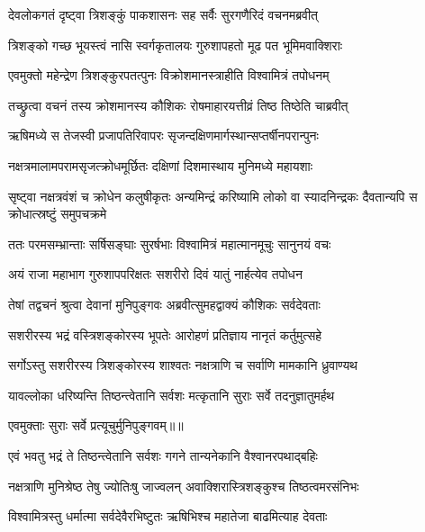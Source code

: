 \twolineshloka
{देवलोकगतं दृष्ट्वा त्रिशङ्कुं पाकशासनः}
{सह सर्वैः सुरगणैरिदं वचनमब्रवीत्} %

\twolineshloka
{त्रिशङ्को गच्छ भूयस्त्वं नासि स्वर्गकृतालयः}
{गुरुशापहतो मूढ पत भूमिमवाक्शिराः} %

\twolineshloka
{एवमुक्तो महेन्द्रेण त्रिशङ्कुरपतत्पुनः}
{विक्रोशमानस्त्राहीति विश्वामित्रं तपोधनम्} %

\twolineshloka
{तच्छ्रुत्वा वचनं तस्य क्रोशमानस्य कौशिकः}
{रोषमाहारयत्तीव्रं तिष्ठ तिष्ठेति चाब्रवीत्} %

\twolineshloka
{ऋषिमध्ये स तेजस्वी प्रजापतिरिवापरः}
{सृजन्दक्षिणमार्गस्थान्सप्तर्षीनपरान्पुनः} %

\twolineshloka
{नक्षत्रमालामपरामसृजत्क्रोधमूर्छितः}
{दक्षिणां दिशमास्थाय मुनिमध्ये महायशाः} %

\threelineshloka
{सृष्ट्वा नक्षत्रवंशं च क्रोधेन कलुषीकृतः}
{अन्यमिन्द्रं करिष्यामि लोको वा स्यादनिन्द्रकः}
{दैवतान्यपि स क्रोधात्स्रष्टुं समुपचक्रमे} %

\twolineshloka
{ततः परमसम्भ्रान्ताः सर्षिसङ्घाः सुरर्षभाः}
{विश्वामित्रं महात्मानमूचुः सानुनयं वचः} %

\twolineshloka
{अयं राजा महाभाग गुरुशापपरिक्षतः}
{सशरीरो दिवं यातुं नार्हत्येव तपोधन} %

\twolineshloka
{तेषां तद्वचनं श्रुत्वा देवानां मुनिपुङ्गवः}
{अब्रवीत्सुमहद्वाक्यं कौशिकः सर्वदेवताः} %

\twolineshloka
{सशरीरस्य भद्रं वस्त्रिशङ्कोरस्य भूपतेः}
{आरोहणं प्रतिज्ञाय नानृतं कर्तुमुत्सहे} %

\twolineshloka
{सर्गोऽस्तु सशरीरस्य त्रिशङ्कोरस्य शाश्वतः}
{नक्षत्राणि च सर्वाणि मामकानि ध्रुवाण्यथ} %

\twolineshloka
{यावल्लोका धरिष्यन्ति तिष्ठन्त्वेतानि सर्वशः}
{मत्कृतानि सुराः सर्वे तदनुज्ञातुमर्हथ} %

{एवमुक्ताः सुराः सर्वे प्रत्यूचुर्मुनिपुङ्गवम्॥॥} %

\addtocounter{shlokacount}{1}

\twolineshloka
{एवं भवतु भद्रं ते तिष्ठन्त्वेतानि सर्वशः}
{गगने तान्यनेकानि वैश्वानरपथाद्बहिः} %

\twolineshloka
{नक्षत्राणि मुनिश्रेष्ठ तेषु ज्योतिःषु जाज्वलन्}
{अवाक्शिरास्त्रिशङ्कुश्च तिष्ठत्वमरसंनिभः} %

\twolineshloka
{विश्वामित्रस्तु धर्मात्मा सर्वदेवैरभिष्टुतः}
{ऋषिभिश्च महातेजा बाढमित्याह देवताः} %

